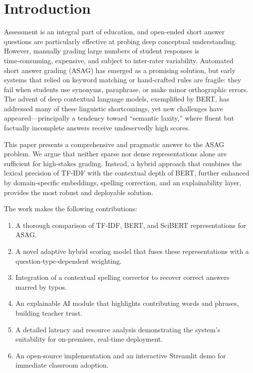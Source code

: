 \documentclass[11pt,a4paper]{article}
\begin{document}
\section{Introduction}
\label{sec:introduction}
Assessment is an integral part of education, and open‑ended short answer questions are particularly effective at probing deep conceptual understanding. However, manually grading large numbers of student responses is time‑consuming, expensive, and subject to inter‑rater variability. Automated short answer grading (ASAG) has emerged as a promising solution, but early systems that relied on keyword matching or hand‑crafted rules are fragile: they fail when students use synonyms, paraphrase, or make minor orthographic errors. The advent of deep contextual language models, exemplified by BERT, has addressed many of these linguistic shortcomings, yet new challenges have appeared---principally a tendency toward ``semantic laxity,'' where fluent but factually incomplete answers receive undeservedly high scores.

This paper presents a comprehensive and pragmatic answer to the ASAG problem. We argue that neither sparse nor dense representations alone are sufficient for high‑stakes grading. Instead, a hybrid approach that combines the lexical precision of TF‑IDF with the contextual depth of BERT, further enhanced by domain‑specific embeddings, spelling correction, and an explainability layer, provides the most robust and deployable solution.

The work makes the following contributions:
\begin{enumerate}[noitemsep]
\item A thorough comparison of TF‑IDF, BERT, and SciBERT representations for ASAG.
\item A novel adaptive hybrid scoring model that fuses these representations with a question‑type‑dependent weighting.
\item Integration of a contextual spelling corrector to recover correct answers marred by typos.
\item An explainable AI module that highlights contributing words and phrases, building teacher trust.
\item A detailed latency and resource analysis demonstrating the system's suitability for on‑premises, real‑time deployment.
\item An open‑source implementation and an interactive Streamlit demo for immediate classroom adoption.
\end{enumerate}
\end{document}
